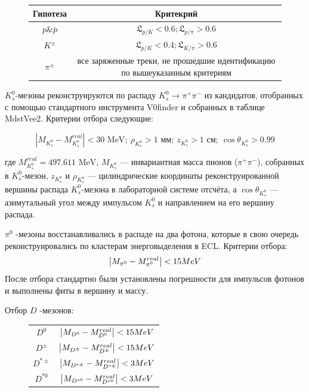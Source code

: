 \begin{figure}[h]
    \centering
    \begin{tabular}{c|c}
        Гипотеза & Критекрий \\ \hline
        $p \& \bar p$ & $\mathfrak{L}_{p/K} < 0.6; \mathfrak{L}_{p/\pi} > 0.6$ \\
        $K^\pm$   & $\mathfrak{L}_{p/K} < 0.4; \mathfrak{L}_{K/\pi} > 0.6$ \\
        $\pi^{\pm}$ & все заряженные треки, не прошедшие идентификацию по вышеуказанным критериям \\
    \end{tabular}
\end{figure}

\newdot $K_s^0$-мезоны реконструируются по распаду $K_s^0 \to \pi^+ \pi^-$ из кандидатов, отобранных с помощью стандартного инструмента V0finder и собранных в таблице MdstVee2. Критерии отбора следующие:

$$
\left| M_{K_s^0} - M^{real}_{K_s^0} \right| < 30 \text{ MeV}; \ \rho_{K_s^0} > 1 \text{ мм}; \ z_{K_s^0} > 1 \text{ см}; \ \cos \theta_{K_s^0} > 0.99
$$

где $M^{real}_{K_s^0} = 497.611 \text{ MeV}$, $M_{K_s^0}$ — инвариантная масса пионов ($\pi^+ \pi^-$), собранных в $K_s^0$-мезон, $z_{K_s^0}$ и $\rho_{K_s^0}$ — цилиндрические координаты реконструированной вершины распада $K_s^0$-мезона в лабораторной системе отсчёта, а $\cos \theta_{K_s^0}$ — азимутальный угол между импульсом $K_s^0$ и направлением на его вершину распада.

\newdot $\pi^0$ -мезоны восстанавливались в распаде на два фотона, которые в
свою очередь реконструировались по кластерам энерговыделения в ECL.
Критерии отбора:
$$
\abs{M_{\pi^0} - M_{\pi^0}^{real}} < 15 MeV 
$$
После отбора стандартно были установлены погрешности для импульсов фотонов и выполнены фиты в вершину и массу.

\newdot Отбор $D$ -мезонов:

\begin{figure}[h]
    \centering
    \begin{tabular}{c|c}
        $D^0$ & $\abs{M_{D^0} - M^{real}_{D^0}} < 15 MeV$ \\
        $D^\pm$ & $\abs{M_{D^\pm} - M^{real}_{D^\pm}} < 15 MeV$ \\
        $D^{*\pm}$ & $\abs{M_{D^{*\pm}} - M^{real}_{D^{*\pm}}} < 3 MeV$ \\
        $D^{*0}$ & $\abs{M_{D^{*0}} - M^{real}_{D^{*0}}} < 3 MeV$ \\
    \end{tabular}
\end{figure}

